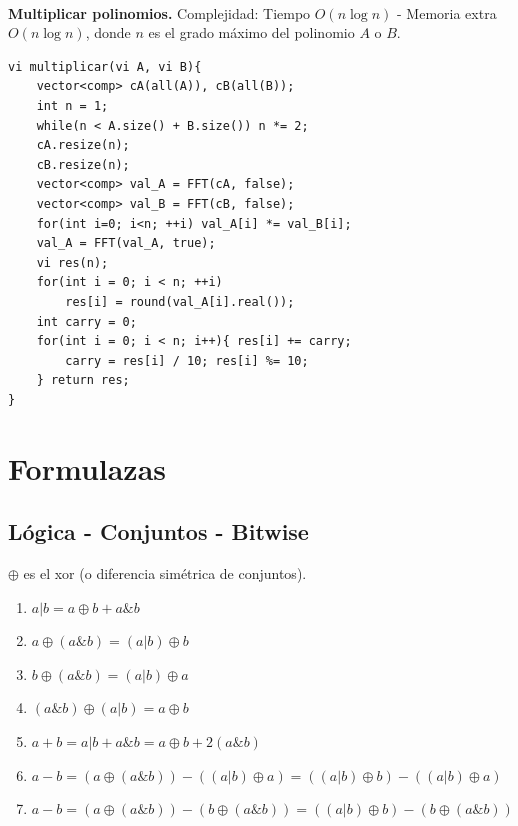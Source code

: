 \documentclass[10pt,spanish,mexico]{article}
\numberwithin{equation}{section}
\begin{document}
\begin{multicols}{2}
\vspace{-1.2\baselineskip}
\hrulefill\\
\textbf{Multiplicar polinomios.} Complejidad: Tiempo $O(n\log n)$ - Memoria extra $O(n\log n)$, donde $n$ es el grado máximo del polinomio $A$ o $B$.
\begin{verbatim}
vi multiplicar(vi A, vi B){
    vector<comp> cA(all(A)), cB(all(B));
    int n = 1;
    while(n < A.size() + B.size()) n *= 2;
    cA.resize(n);
    cB.resize(n);
    vector<comp> val_A = FFT(cA, false);
    vector<comp> val_B = FFT(cB, false);
    for(int i=0; i<n; ++i) val_A[i] *= val_B[i];
    val_A = FFT(val_A, true);
    vi res(n);
    for(int i = 0; i < n; ++i)
        res[i] = round(val_A[i].real());
    int carry = 0;
    for(int i = 0; i < n; i++){ res[i] += carry;
        carry = res[i] / 10; res[i] %= 10;
    } return res;
}
\end{verbatim}


\vspace{-1.2\baselineskip}
\hrulefill
\section{Formulazas}

\subsection{Lógica - Conjuntos - Bitwise}
$\oplus$ es el xor (o diferencia simétrica de conjuntos).
\begin{enumerate}[1.]
    \item $a|b = a\oplus b + a \& b$
    \item $a\oplus (a\&b) = (a|b)\oplus b$
    \item $b\oplus (a\&b) = (a|b)\oplus a$
    \item $(a\&b)\oplus (a|b) = a\oplus b$
    \item $a + b = a|b + a\&b = a\oplus b + 2(a\&b)$
    \item $a - b = (a\oplus (a\&b))-((a|b)\oplus a) = ((a|b)\oplus b)-((a|b)\oplus a)$
    \item $a - b = (a\oplus (a\&b))-(b\oplus (a\&b)) = ((a|b)\oplus b)-(b\oplus (a\&b))$
\end{enumerate}


\end{multicols}
\end{document}
